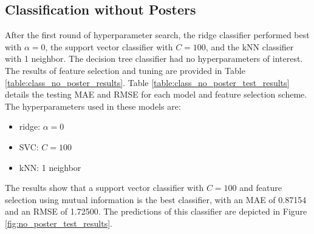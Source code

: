 \documentclass[12pt, oneside]{article}   	%
\begin{document}
\subsection{Classification without Posters}
\label{section:class_no_posters_results}

After the first round of hyperparameter search, the ridge classifier performed best with $\alpha=0$, the support vector classifier with $C=100$, and the kNN classifier with 1 neighbor. The decision tree classifier had no hyperparameters of interest. The results of feature selection and tuning are provided in Table \ref{table:class_no_poster_results}. Table \ref{table:class_no_poster_test_results} details the testing MAE and RMSE for each model and feature selection scheme. The hyperparameters used in these models are:
\begin{itemize}
\item ridge: $\alpha=0$
\item SVC: $C=100$
\item kNN: 1 neighbor
\end{itemize}
The results show that a support vector classifier with $C=100$ and feature selection using mutual information is the best classifier, with an MAE of 0.87154 and an RMSE of 1.72500. The predictions of this classifier are depicted in Figure \ref{fig:no_poster_test_results}.

\begin{table}[]
\caption{\label{table:class_no_poster_results}Results of feature selection and hyperparameter tuning without posters.}
\end{table}
\end{document}
